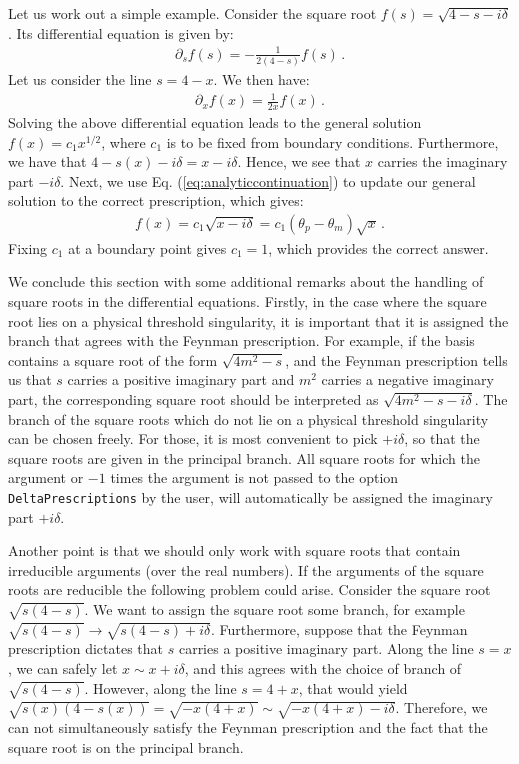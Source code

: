 \documentclass{article}
\begin{document}
Let us work out a simple example. Consider the square root $f(s) = \sqrt{4-s-i\delta}$. Its differential equation is given by:
\begin{align}
    \partial_s f(s) = -\frac{1}{2(4-s)} f(s)\,.
\end{align}
Let us consider the line $s = 4 - x$. We then have:
\begin{align}
    \label{eq:exlinediffeqns}
    \partial_x f(x) = \frac{1}{2 x}f(x)\,.
\end{align}
Solving the above differential equation leads to the general solution $f(x) = c_1 x^{1/2}$, where $c_1$ is to be fixed from boundary conditions. Furthermore, we have that $4-s(x) - i\delta = x - i\delta$. Hence, we see that $x$ carries the imaginary part $-i\delta$. Next, we use Eq. (\ref{eq:analyticcontinuation}) to update our general solution to the correct prescription, which gives:
\begin{align}
    f(x) = c_1 \sqrt{x-i\delta} = c_1 (\theta_p-\theta_m)\sqrt{x}\,.
\end{align}
Fixing $c_1$ at a boundary point gives $c_1 = 1$, which provides the correct answer.

We conclude this section with some additional remarks about the handling of square roots in the differential equations. Firstly, in the case where the square root lies on a physical threshold singularity, it is important that it is assigned the branch that agrees with the Feynman prescription. For example, if the basis contains a square root of the form $\sqrt{4m^2-s}$, and the Feynman prescription tells us that $s$ carries a positive imaginary part and $m^2$ carries a negative imaginary part, the corresponding square root should be interpreted as $\sqrt{4m^2-s-i\delta}$. The branch of the square roots which do not lie on a physical threshold singularity can be chosen freely. For those, it is most convenient to pick $+i\delta$, so that the square roots are given in the principal branch. All square roots for which the argument or $-1$ times the argument is not passed to the option \texttt{DeltaPrescriptions} by the user, will automatically be assigned the imaginary part $+i\delta$. 

Another point is that we should only work with square roots that contain irreducible arguments (over the real numbers).
If the arguments of the square roots are reducible the following problem could arise. Consider the square root $\sqrt{s(4-s)}$. We want to assign the square root some branch, for example $\sqrt{s(4-s)} \rightarrow \sqrt{s(4-s)+i\delta}$. Furthermore, suppose that the Feynman prescription dictates that $s$ carries a positive imaginary part. Along the line $s=x$, we can safely let $x\sim x+i\delta$, and this agrees with the choice of branch of $\sqrt{s(4-s)}$. However, along the line $s=4+x$, that would yield $\sqrt{s(x)(4-s(x))} = \sqrt{-x(4+x)} \sim \sqrt{-x(4+x)-i\delta}$. Therefore, we can not simultaneously satisfy the Feynman prescription and the fact that the square root is on the principal branch.
\end{document}
